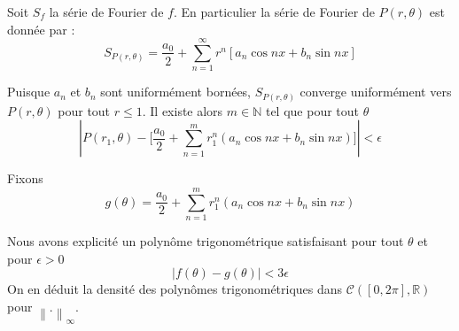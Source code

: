 \documentclass[
	10pt, %
	xcolor={svgnames}
]{beamer}
\begin{document}
\begin{frame}
	Soit \( S_f \) la série de Fourier de \( f \). En particulier la série de Fourier de \( P(r,\theta) \) est donnée par :
	\[
		S_{P(r,\theta)} = \frac{a_0}{2} + 
		\sum_{n=1}^{\infty} r^{n} \left[ a_n \cos nx + b_n \sin nx \right]
	\]

	Puisque \( a_n \) et \( b_n \) sont uniformément bornées, \( S_{P(r,\theta)} \) converge uniformément vers \( P(r,\theta) \) pour tout \( r \le 1 \). Il existe alors \( m \in \mathbb{N} \) tel que pour tout \( \theta \) 
	\begin{equation*}
		{\left\lvert P(r_1,\theta) - 
		\lbrack \frac{a_0}{2} + \sum_{n=1}^{m} r_1^{n}(a_n \cos nx + b_n \sin nx) \rbrack \right\rvert} < \epsilon
	\end{equation*}

	Fixons
	\begin{equation*}
		g(\theta) = \frac{a_0}{2} + \sum_{n=1}^{m} r_1^{n}(a_n \cos nx + b_n \sin nx) 
	\end{equation*}

	Nous avons explicité un polynôme trigonométrique satisfaisant pour tout \( \theta \) et pour \( \epsilon > 0 \)
	\begin{equation*}
		{\left\lvert f(\theta) - g(\theta) \right\rvert} < 3\epsilon
	\end{equation*}
	On en déduit la densité des polynômes trigonométriques dans \( \mathcal{C}([0,2\pi],\mathbb{R}) \) pour \( {\left\lVert . \right\rVert}_{\infty} \).
\end{frame}
\end{document}
